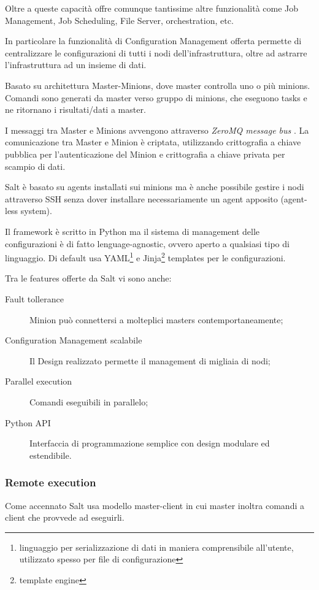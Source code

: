 Oltre a queste capacità offre comunque tantissime altre funzionalità come Job Management, Job Scheduling, File Server, orchestration, etc.


In particolare la funzionalità di Configuration Management offerta permette di centralizzare le configurazioni di tutti i nodi dell'infrastruttura, oltre ad astrarre l'infrastruttura ad un insieme di dati.

Basato su architettura Master-Minions, dove master controlla uno o più minions. Comandi sono generati da master verso gruppo di minions, che eseguono tasks e ne ritornano i risultati/dati a master.

I messaggi tra Master e Minions avvengono attraverso \textit{ZeroMQ message bus} \cite{zeromq}. La comunicazione tra Master e Minion è criptata, utilizzando crittografia a chiave pubblica per l'autenticazione del Minion e  crittografia a chiave privata per scampio di dati.

Salt è basato su agents installati sui  minions ma è anche possibile gestire i nodi attraverso SSH senza dover installare necessariamente un agent apposito (agent-less system).

Il framework è scritto in Python ma il sistema di management delle configurazioni è di fatto lenguage-agnostic, ovvero aperto a qualsiasi tipo di linguaggio.
Di default usa YAML\footnote{linguaggio per serializzazione di dati in maniera comprensibile all'utente, utilizzato spesso per file di configurazione}   \cite{yaml} e Jinja\footnote{template engine} \cite{jinja} templates per le configurazioni.

Tra le features offerte da Salt vi sono anche:
\begin{description}
    \item[Fault tollerance]  Minion può connettersi a molteplici masters contemportaneamente;
    \item[Configuration Management scalabile] Il Design realizzato permette il management di migliaia di nodi;
    \item[Parallel execution] Comandi eseguibili in parallelo;
    \item[Python API] Interfaccia di programmazione semplice con design modulare ed estendibile.
\end{description}



\subsubsection{Remote execution}
Come accennato Salt usa modello master-client in cui master inoltra comandi a client che provvede ad eseguirli.

